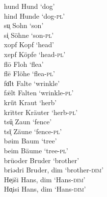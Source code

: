 \ea%
\label{ex:6:4}
\ea\label{ex:6:4a}  hund      \tab  [hund]  \tab Hund    \tab ‘dog’        \\
     hind      \tab  [hind]  \tab Hunde   \tab ‘dog-\textsc{pl}’       \\
\ex\label{ex:6:4b}  su͔       \tab   [sũ]   \tab  Sohn   \tab  ‘son’      \\
     si͔       \tab   [sĩ]   \tab  Söhne  \tab  ‘son-\textsc{pl}’     \\
\ex\label{ex:6:4c}  xopf      \tab  [xopf]  \tab Kopf    \tab ‘head’       \\
     xepf      \tab  [xepf]  \tab Köpfe   \tab ‘head-\textsc{pl}’      \\
\ex\label{ex:6:4d}  flō       \tab  [floː]  \tab Floh    \tab ‘flea’      \\
     flē       \tab  [fleː]  \tab Flöhe   \tab ‘flea-\textsc{pl}’     \\
\ex\label{ex:6:4e}  fɑ̄lt      \tab  [fɑːlt] \tab Falte   \tab ‘wrinkle’   \\
     f\={æ}lt  \tab  [fæːlt] \tab Falten  \tab  ‘wrinkle-\textsc{pl}’ \\
\z 
\ex%
\label{ex:6:5}
\ea\label{ex:6:5a}  krǖt    \tab [kryːt]   \tab Kraut   \tab ‘herb’     \\
     krītter \tab [kriːter] \tab Kräuter \tab ‘herb-\textsc{pl}’    \\
\ex\label{ex:6:5b}  tsü͔    \tab  [tsỹː]   \tab  Zaun   \tab  ‘fence’ \\
     tsī͔    \tab  [tsĩː]   \tab  Zäune  \tab  ‘fence-\textsc{pl}’\\
\z 
\ex \label{ex:6:6}
\ea\label{ex:6:6a}  bøim    \tab [bøim]    \tab Baum         \tab ‘tree’                    \\
     beim    \tab [beim]    \tab Bäume        \tab ‘tree-\textsc{pl}’                   \\
\ex\label{ex:6:6b}  brüoder \tab [bryoder] \tab Bruder       \tab  ‘brother’                \\
     briədri \tab [briædri] \tab Bruder, dim  \tab ‘brother\textsc{{}-dim}’  \\
\ex\label{ex:6:6c}  He͔iši  \tab  [hẽiʃi]  \tab  Hans, dim   \tab  ‘Hans\textsc{{}-dim}’   \\
     Hɑ͔isi  \tab  [h\~ɑisi]  \tab  Hans, dim   \tab  ‘Hans\textsc{{}-dim}’   \\
\z 
\z 

